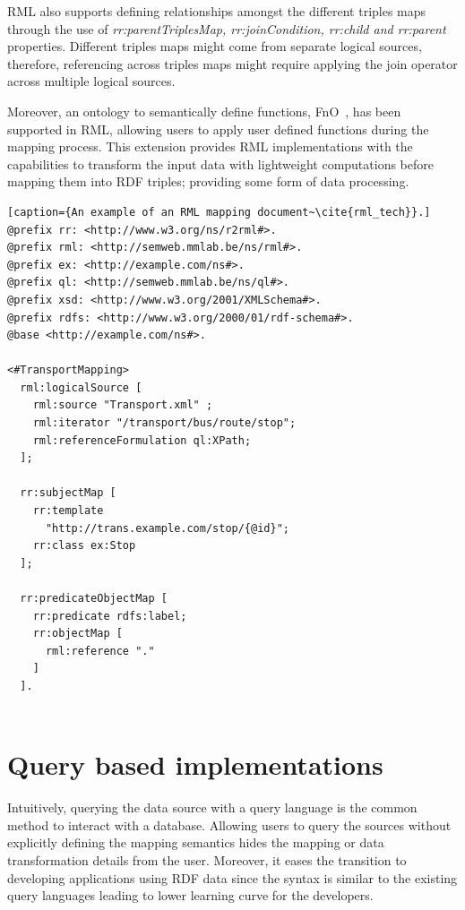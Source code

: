 RML also supports defining relationships amongst the different 
triples maps through the use of \textit{rr:parentTriplesMap, rr:joinCondition, rr:child and rr:parent}
properties. Different triples maps might come from separate logical sources, therefore, 
referencing across triples maps might require applying the join operator across multiple 
logical sources. 

Moreover, an ontology to semantically define functions, FnO~\cite{fno_ben}, has been supported 
in RML, allowing users to apply user defined functions during the mapping process. This 
extension provides RML implementations with the capabilities to transform the input data with 
lightweight computations before mapping them into RDF triples; providing some form of 
data processing. 

\begin{lstlisting}[caption={An example of an RML mapping document~\cite{rml_tech}}.]
@prefix rr: <http://www.w3.org/ns/r2rml#>.
@prefix rml: <http://semweb.mmlab.be/ns/rml#>.
@prefix ex: <http://example.com/ns#>.
@prefix ql: <http://semweb.mmlab.be/ns/ql#>.
@prefix xsd: <http://www.w3.org/2001/XMLSchema#>.
@prefix rdfs: <http://www.w3.org/2000/01/rdf-schema#>.
@base <http://example.com/ns#>.

<#TransportMapping>
  rml:logicalSource [
    rml:source "Transport.xml" ;
    rml:iterator "/transport/bus/route/stop";
    rml:referenceFormulation ql:XPath;
  ];

  rr:subjectMap [
    rr:template
      "http://trans.example.com/stop/{@id}";
    rr:class ex:Stop
  ];

  rr:predicateObjectMap [
    rr:predicate rdfs:label;
    rr:objectMap [
      rml:reference "."
    ]
  ].
    
\end{lstlisting}

\section{Query based implementations}
\label{sec:query_based_implementations}

Intuitively, querying the data source with a 
query language is the common method to interact 
with a database. Allowing users to query the sources without explicitly 
defining the mapping semantics hides the mapping or data transformation details from the user. 
Moreover, it eases the transition to developing applications using RDF data since the syntax is 
similar to the existing query languages leading to lower learning curve for the developers.


